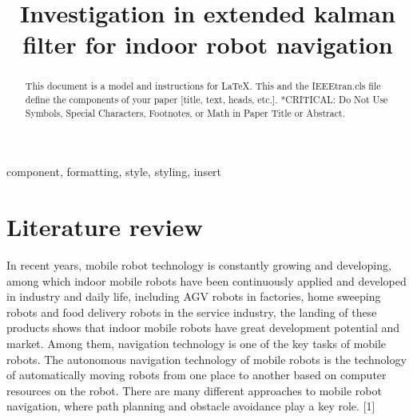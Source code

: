 \documentclass[conference]{IEEEtran}
\begin{document}
	
	\title{Investigation in extended kalman filter for indoor robot navigation\\
	}
	
	\author{
	}
	
	\maketitle
	
	\begin{abstract}
		This document is a model and instructions for \LaTeX.
		This and the IEEEtran.cls file define the components of your paper [title, text, heads, etc.]. *CRITICAL: Do Not Use Symbols, Special Characters, Footnotes, 
		or Math in Paper Title or Abstract.
	\end{abstract}
	
	\begin{IEEEkeywords}
		component, formatting, style, styling, insert
	\end{IEEEkeywords}
	
	\section{Literature review}
	
	In recent years, mobile robot technology is constantly growing and developing, among which indoor mobile robots have been continuously applied and developed in industry and daily life, including AGV robots in factories, home sweeping robots and food delivery robots in the service industry, the landing of these products shows that indoor mobile robots have great development potential and market. Among them, navigation technology is one of the key tasks of mobile robots. The autonomous navigation technology of mobile robots is the technology of automatically moving robots from one place to another based on computer resources on the robot. There are many different approaches to mobile robot navigation, where path planning and obstacle avoidance play a key role. [1]
	
\end{document}
